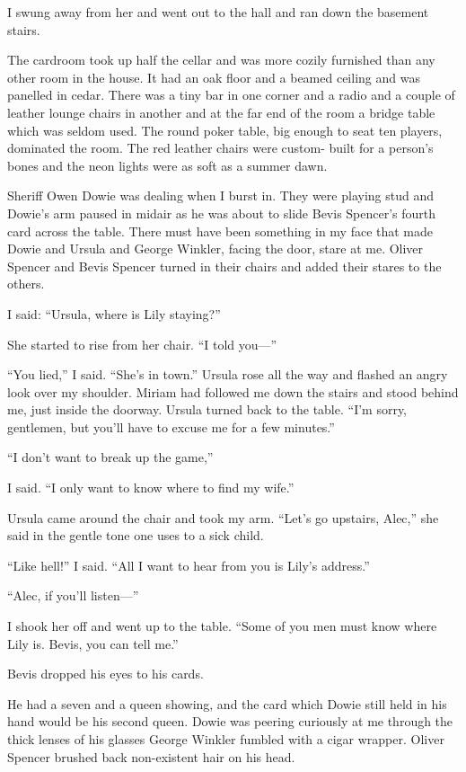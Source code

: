 {I swung away from her and went out to the hall and ran down the basement stairs.

The cardroom took up half the cellar and was more cozily furnished than any other room in the house. It had an oak floor and a beamed ceiling and was panelled in cedar. There was a tiny bar in one corner and a radio and a couple of leather lounge chairs in another and at the far end of the room a bridge table which was seldom used. The round poker table, big enough to seat ten players, dominated the room. The red leather chairs were custom- built for a person’s bones and the neon lights were as soft as a summer dawn.

Sheriff Owen Dowie was dealing when I burst in. They were playing stud and Dowie’s arm paused in midair as he was about to slide Bevis Spencer’s fourth card across the table. There must have been something in my face that made Dowie and Ursula and George Winkler, facing the door, stare at me. Oliver Spencer and Bevis Spencer turned in their chairs and added their stares to the others.

I said: “Ursula, where is Lily staying?”

She started to rise from her chair. “I told you—”

“You lied,” I said. “She’s in town.” Ursula rose all the way and flashed an angry look over my shoulder. Miriam had followed me down the stairs and stood behind me, just inside the doorway. Ursula turned back to the table. “I’m sorry, gentlemen, but you’ll have to excuse me for a few minutes.”

“I don’t want to break up the game,”

I said. “I only want to know where to find my wife.”

Ursula came around the chair and took my arm. “Let’s go upstairs, Alec,” she said in the gentle tone one uses to a sick child.

“Like hell!” I said. “All I want to hear from you is Lily’s address.”

“Alec, if you’ll listen—”

I shook her off and went up to the table. “Some of you men must know where Lily is. Bevis, you can tell me.”

Bevis dropped his eyes to his cards.

He had a seven and a queen showing, and the card which Dowie still held in his hand would be his second queen. Dowie was peering curiously at me through the thick lenses of his glasses George Winkler fumbled with a cigar wrapper. Oliver Spencer brushed back non-existent hair on his head.

}
